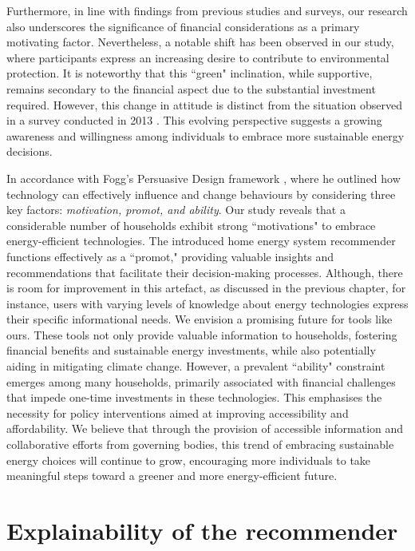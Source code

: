 Furthermore, in line with findings from previous studies and surveys, our research also underscores the significance of financial considerations as a primary motivating factor. 
Nevertheless, a notable shift has been observed in our study, where participants express an increasing desire to contribute to environmental protection.
It is noteworthy that this ``green" inclination, while supportive, remains secondary to the financial aspect due to the substantial investment required. 
However, this change in attitude is distinct from the situation observed in a survey conducted in 2013 \cite{informationgap}. 
This evolving perspective suggests a growing awareness and willingness among individuals to embrace more sustainable energy decisions.

In accordance with Fogg's Persuasive Design framework \cite{Fogg2009}, 
where he outlined how technology can effectively influence and change behaviours by considering three key factors: 
\emph{motivation, promot, and ability}. 
Our study reveals that a considerable number of households exhibit strong ``motivations" to embrace energy-efficient technologies. 
The introduced home energy system recommender functions effectively as a ``promot," providing valuable insights and recommendations that facilitate their decision-making processes. 
Although, there is room for improvement in this artefact, as discussed in the previous chapter,
for instance, users with varying levels of knowledge about energy technologies express their specific informational needs.
We envision a promising future for tools like ours.
These tools not only provide valuable information to households, fostering financial benefits and sustainable energy investments, while also potentially aiding in mitigating climate change. 
However, a prevalent ``ability" constraint emerges among many households,
primarily associated with financial challenges that impede one-time investments in these technologies. 
This emphasises the necessity for policy interventions aimed at improving accessibility and affordability. 
We believe that through the provision of accessible information and collaborative efforts from governing bodies, this trend of embracing sustainable energy choices will continue to grow, encouraging more individuals to take meaningful steps toward a greener and more energy-efficient future.  


\section*{Explainability of the recommender}

